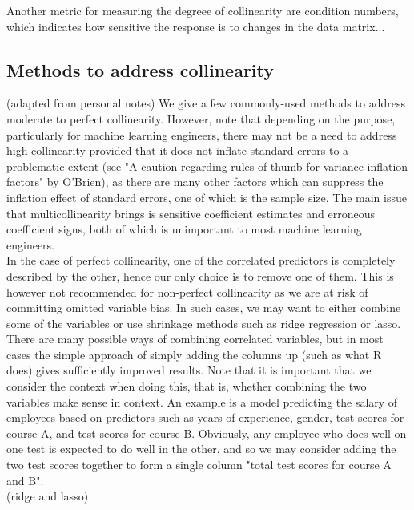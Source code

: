 \documentclass[12pt]{article}
\begin{document}
	Another metric for measuring the degreee of collinearity are condition numbers, which indicates how sensitive the response is to changes in the data matrix...
	
	\subsection{Methods to address collinearity}
	
	(adapted from personal notes) We give a few commonly-used methods to address moderate to perfect collinearity. However, note that depending on the purpose, particularly for machine learning engineers, there may not be a need to address high collinearity provided that it does not inflate standard errors to a problematic extent (see "A caution regarding rules of thumb for variance inflation factors" by O'Brien), as there are many other factors which can suppress the inflation effect of standard errors, one of which is the sample size. The main issue that multicollinearity brings is sensitive coefficient estimates and erroneous coefficient signs, both of which is unimportant to most machine learning engineers.\\
	
	In the case of perfect collinearity, one of the correlated predictors is completely described by the other, hence our only choice is to remove one of them. This is however not recommended for non-perfect collinearity as we are at risk of committing omitted variable bias. In such cases, we may want to either combine some of the variables or use shrinkage methods such as ridge regression or lasso.\\
	
	There are many possible ways of combining correlated variables, but in most cases the simple approach of simply adding the columns up (such as what R does) gives sufficiently improved results. Note that it is important that we consider the context when doing this, that is, whether combining the two variables make sense in context. An example is a model predicting the salary of employees based on predictors such as years of experience, gender, test scores for course A, and test scores for course B. Obviously, any employee who does well on one test is expected to do well in the other, and so we may consider adding the two test scores together to form a single column "total test scores for course A and B".\\
	
	(ridge and lasso)
	
	
	
\end{document}
